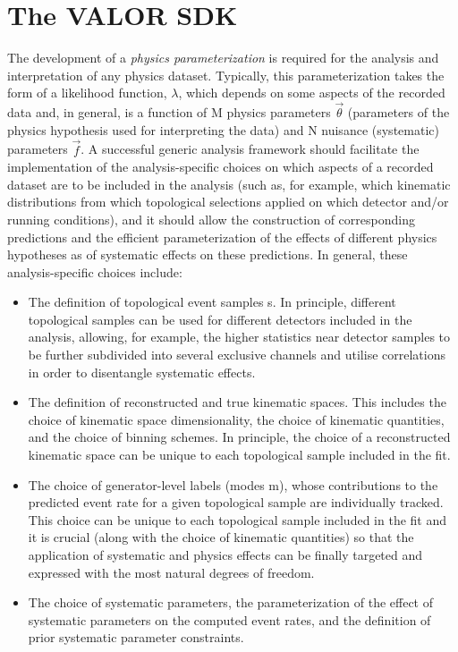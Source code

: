 
\section{The VALOR SDK}

The development of a {\em physics parameterization} is required
for the analysis and interpretation of any physics dataset.
Typically, this parameterization takes the form of a likelihood function, $\lambda$,
which depends on some aspects of the recorded data and, 
in general, is a function of 
M physics parameters $\vec{\theta}$ 
(parameters of the physics hypothesis used for interpreting the data)
and
N nuisance (systematic) parameters $\vec{f}$.
A successful generic analysis framework should facilitate the implementation of the analysis-specific choices on which aspects of a recorded dataset are to be included in the analysis (such as, for example, which kinematic distributions from which topological selections applied on which detector and/or running conditions), and it should allow the construction of corresponding predictions and the efficient parameterization of the effects of
different physics hypotheses as of systematic effects on these predictions. 
In general, these analysis-specific choices include:
\begin{itemize}
    \item The definition of topological event samples s.
          In principle, different topological samples can be used for 
          different detectors included in the analysis,
          allowing, for example, the higher statistics near detector samples to be
          further subdivided into several exclusive channels and
          utilise correlations in order to disentangle systematic effects.
    \item The definition of reconstructed and true kinematic spaces.
          This includes the choice of kinematic space dimensionality,
          the choice of kinematic quantities, and the choice of binning schemes. 
          In principle, the choice of a reconstructed kinematic space
          can be unique to each topological sample included in the fit.
    \item The choice of generator-level labels (modes m), whose contributions to
          the predicted event rate for a given topological sample are individually 
          tracked. This choice can be unique to each topological sample included 
          in the fit and it is crucial (along with the choice of kinematic quantities)
          so that the application of systematic and physics effects can be 
          finally targeted and expressed with the most natural degrees of freedom.
    \item The choice of systematic parameters, the parameterization of the 
          effect of systematic parameters on the computed event rates, and the
          definition of prior systematic parameter constraints.
\end{itemize}

